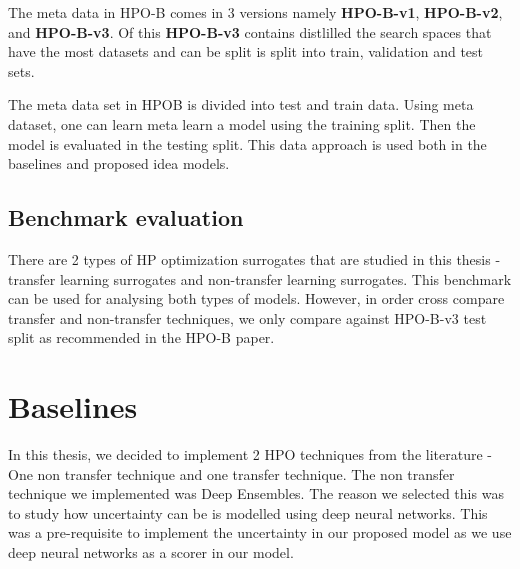 \documentclass[11pt]{report}
\begin{document}
The meta data in HPO-B comes in 3 versions namely \textbf{HPO-B-v1},  \textbf{HPO-B-v2}, and \textbf{HPO-B-v3}.
Of this \textbf{HPO-B-v3} contains distlilled the search spaces that have the most datasets and can be split is split into train,  validation and test sets. 


The meta data set in HPOB is divided into test and train data.
Using meta dataset,  one can learn meta learn a model using the training split.
Then the model is evaluated in the testing split.
This data approach is used both in the baselines and proposed idea models.

\subsection{Benchmark evaluation}
There are 2 types of HP optimization surrogates that are studied in this thesis - transfer learning surrogates
and non-transfer learning surrogates.
This benchmark can be used for analysing both types of models.
However,  in order cross compare transfer and non-transfer techniques,  we only compare against HPO-B-v3 test split as recommended in the HPO-B paper.

\section{Baselines}

In this thesis,  we decided to implement 2 HPO techniques from the literature - One non transfer technique and one transfer technique.
The non transfer technique we implemented was Deep Ensembles.
The reason we selected this was to study how uncertainty can be is modelled using deep neural networks.
This was a pre-requisite to implement the uncertainty in our proposed model as we use deep neural networks as a scorer in our model. 
\end{document}
